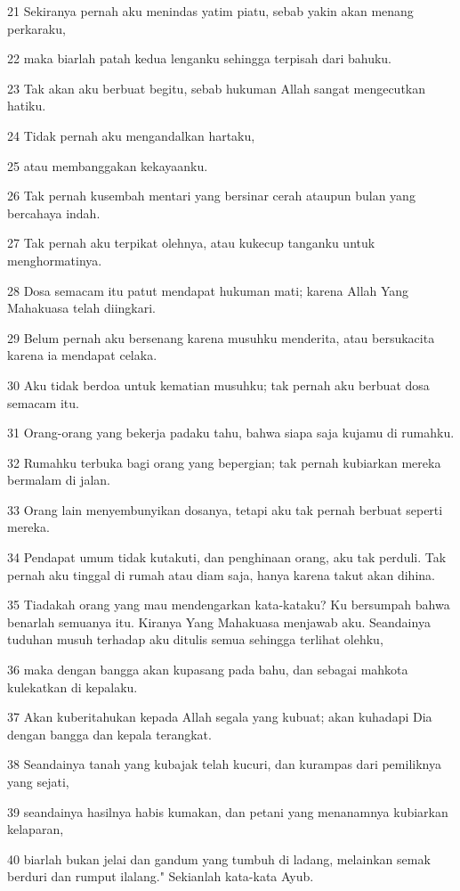\par 21 Sekiranya pernah aku menindas yatim piatu, sebab yakin akan menang perkaraku,
\par 22 maka biarlah patah kedua lenganku sehingga terpisah dari bahuku.
\par 23 Tak akan aku berbuat begitu, sebab hukuman Allah sangat mengecutkan hatiku.
\par 24 Tidak pernah aku mengandalkan hartaku,
\par 25 atau membanggakan kekayaanku.
\par 26 Tak pernah kusembah mentari yang bersinar cerah ataupun bulan yang bercahaya indah.
\par 27 Tak pernah aku terpikat olehnya, atau kukecup tanganku untuk menghormatinya.
\par 28 Dosa semacam itu patut mendapat hukuman mati; karena Allah Yang Mahakuasa telah diingkari.
\par 29 Belum pernah aku bersenang karena musuhku menderita, atau bersukacita karena ia mendapat celaka.
\par 30 Aku tidak berdoa untuk kematian musuhku; tak pernah aku berbuat dosa semacam itu.
\par 31 Orang-orang yang bekerja padaku tahu, bahwa siapa saja kujamu di rumahku.
\par 32 Rumahku terbuka bagi orang yang bepergian; tak pernah kubiarkan mereka bermalam di jalan.
\par 33 Orang lain menyembunyikan dosanya, tetapi aku tak pernah berbuat seperti mereka.
\par 34 Pendapat umum tidak kutakuti, dan penghinaan orang, aku tak perduli. Tak pernah aku tinggal di rumah atau diam saja, hanya karena takut akan dihina.
\par 35 Tiadakah orang yang mau mendengarkan kata-kataku? Ku bersumpah bahwa benarlah semuanya itu. Kiranya Yang Mahakuasa menjawab aku. Seandainya tuduhan musuh terhadap aku ditulis semua sehingga terlihat olehku,
\par 36 maka dengan bangga akan kupasang pada bahu, dan sebagai mahkota kulekatkan di kepalaku.
\par 37 Akan kuberitahukan kepada Allah segala yang kubuat; akan kuhadapi Dia dengan bangga dan kepala terangkat.
\par 38 Seandainya tanah yang kubajak telah kucuri, dan kurampas dari pemiliknya yang sejati,
\par 39 seandainya hasilnya habis kumakan, dan petani yang menanamnya kubiarkan kelaparan,
\par 40 biarlah bukan jelai dan gandum yang tumbuh di ladang, melainkan semak berduri dan rumput ilalang." Sekianlah kata-kata Ayub.

